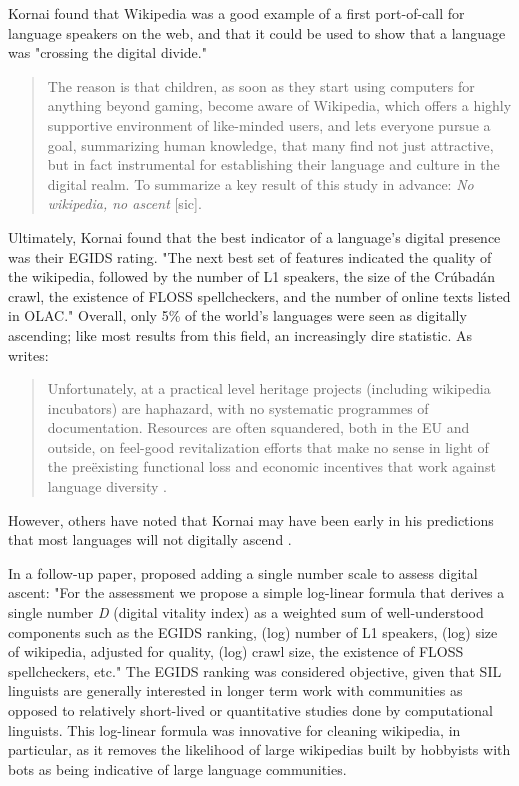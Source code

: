 Kornai found that Wikipedia was a good example of a first port-of-call for language speakers on the web, and that it could be used to show that a language was "crossing the digital divide."

\begin{quote}
The reason is that children, as soon as they start using computers for anything beyond gaming, become aware of Wikipedia, which offers a highly supportive environment of like-minded users, and lets everyone pursue a goal, summarizing human knowledge, that many find not just attractive, but in fact instrumental for establishing their language and culture in the digital realm. To summarize a key result of this study in advance: \emph{No wikipedia, no ascent} [sic]. \citep{kornai2013digital}
\end{quote}

Ultimately, Kornai found that the best indicator of a language's digital presence was their EGIDS rating. "The next best set of features indicated the quality of the wikipedia, followed by the number of L1 speakers, the size of the Cr\'ubad\'an crawl, the existence of FLOSS spellcheckers, and the number of online texts listed in OLAC." \citep[6]{kornai2013digital} Overall, only 5\% of the world's languages were seen as digitally ascending; like most results from this field, an increasingly dire statistic. As \citet[10]{kornai2013digital} writes:

\begin{quote}
Unfortunately, at a practical level heritage projects (including wikipedia incubators) are haphazard, with no systematic programmes of documentation. Resources are often squandered, both in the EU and outside, on feel-good revitalization efforts that make no sense in light of the pre\"{e}xisting functional loss and economic incentives that work against language diversity \citep{ginsburgh2011many}.
\end{quote}

However, others have noted that Kornai may have been early in his predictions that most languages will not digitally ascend \citep{gibson2016assessing}.

In a follow-up paper, \citep{kornai2015new} proposed adding a single number scale to assess digital ascent: "For the assessment we propose a simple log-linear formula that derives a single number {\emph D} (digital vitality index) as a weighted sum of well-understood components such as the EGIDS ranking, (log) number of L1 speakers, (log) size of wikipedia, adjusted for quality, (log) crawl size, the existence of FLOSS spellcheckers, etc." The EGIDS ranking was considered objective, given that SIL linguists are generally interested in longer term work with communities as opposed to relatively short-lived or quantitative studies done by computational linguists. This log-linear formula was innovative for cleaning wikipedia, in particular, as it removes the likelihood of large wikipedias built by hobbyists with bots as being indicative of large language communities.

